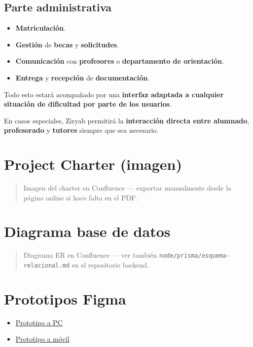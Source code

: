 \documentclass[
  spanish,
  11pt,
]{report}
\providecommand{\tightlist}{%
  \setlength{\itemsep}{0pt}\setlength{\parskip}{0pt}}
\begin{document}
\subsection{Parte administrativa}\label{parte-administrativa}

\begin{itemize}
\tightlist
\item
  \textbf{Matriculación}.
\item
  \textbf{Gestión} de \textbf{becas} y \textbf{solicitudes}.
\item
  \textbf{Comunicación} con \textbf{profesores} o \textbf{departamento
  de orientación}.
\item
  \textbf{Entrega} y \textbf{recepción} de \textbf{documentación}.
\end{itemize}

Todo esto estará acompañado por una \textbf{interfaz adaptada a
cualquier situación de dificultad por parte de los usuarios}.

En casos especiales, Ziryab permitirá la \textbf{interacción directa
entre alumnado}, \textbf{profesorado} y \textbf{tutores} siempre que sea
necesario.

\section{Project Charter (imagen)}\label{project-charter-imagen}

\begin{quote}
Imagen del charter en Confluence --- exportar manualmente desde la
página online si hace falta en el PDF.
\end{quote}

\section{Diagrama base de datos}\label{diagrama-base-de-datos}

\begin{quote}
Diagrama ER en Confluence --- ver también
\texttt{node/prisma/esquema-relacional.md} en el repositorio backend.
\end{quote}

\section{Prototipos Figma}\label{prototipos-figma}

\begin{itemize}
\tightlist
\item
  \href{https://g-team-ddm5j4dr.atlassian.net/wiki/spaces/Ziryab/pages/2261253\#Prototipo-PC}{Prototipo
  a PC}
\item
  \href{https://www.figma.com/proto/j1rFThKhIcsvGUbp0JYK7U/Ziryab?page-id=0\%3A1&node-id=35-93&p=f&viewport=-3034\%2C71\%2C0.56&t=mgKuJhBCeqkAkSzV-1&scaling=scale-down&content-scaling=fixed&starting-point-node-id=35\%3A93}{Prototipo
  a móvil}
\end{itemize}
\end{document}
